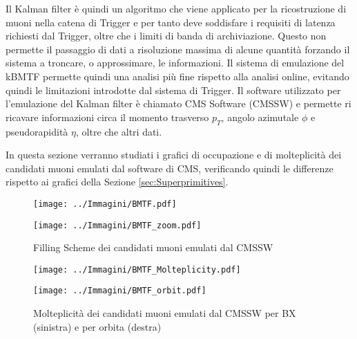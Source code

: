 Il Kalman filter è quindi un algoritmo che viene applicato per la ricostruzione di muoni nella catena di Trigger e per tanto deve soddisfare i requisiti di latenza richiesti dal Trigger, oltre che i limiti di banda di archiviazione. Questo non permette il passaggio di dati a risoluzione massima di alcune quantità forzando il sistema a troncare, o approssimare, le informazioni. Il sistema di emulazione del kBMTF permette quindi una analisi più fine rispetto alla analisi online, evitando quindi le limitazioni introdotte dal sistema di Trigger. Il software utilizzato per l'emulazione del Kalman filter è chiamato CMS Software (CMSSW) e permette ri ricavare informazioni circa il momento trasverso $p_T$, angolo azimutale $\phi$ e pseudorapidità $\eta$, oltre che altri dati.

In questa sezione verranno studiati i grafici di occupazione e di molteplicità dei candidati muoni emulati dal software di CMS, verificando quindi le differenze rispetto ai grafici della Sezione \ref{sec:Superprimitives}.



\begin{figure}[t]
  \centering
  \begin{minipage}[b]{0.49\textwidth}
      \centering
      \texttt{[image: ../Immagini/BMTF.pdf]} 
    \end{minipage}
    \hfill 
    \begin{minipage}[b]{0.49\textwidth}
      \centering
      \texttt{[image: ../Immagini/BMTF\_zoom.pdf]} 
    \end{minipage}
    \caption{Filling Scheme dei candidati muoni emulati dal CMSSW}
  \label{fig:BMTFMuons}
\end{figure}

\begin{figure}[b]
  \centering
  \begin{minipage}[b]{0.49\textwidth}
      \centering
      \texttt{[image: ../Immagini/BMTF\_Molteplicity.pdf]} 
    \end{minipage}
    \hfill 
    \begin{minipage}[b]{0.49\textwidth}
      \centering
      \texttt{[image: ../Immagini/BMTF\_orbit.pdf]} 
    \end{minipage}
    \caption{Molteplicità dei candidati muoni emulati dal CMSSW per BX (sinistra) e per orbita (destra)}
  \label{fig:BMTFMolteplicity}
\end{figure}

